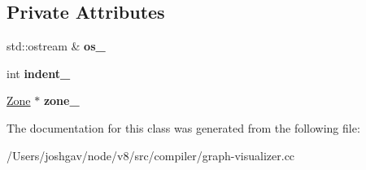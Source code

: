 \subsection*{Private Attributes}
\begin{DoxyCompactItemize}
\item 
std\+::ostream \& {\bfseries os\+\_\+}\hypertarget{classv8_1_1internal_1_1compiler_1_1_graph_c1_visualizer_a02c609603eafbffed257e4540e0d3e1b}{}\label{classv8_1_1internal_1_1compiler_1_1_graph_c1_visualizer_a02c609603eafbffed257e4540e0d3e1b}

\item 
int {\bfseries indent\+\_\+}\hypertarget{classv8_1_1internal_1_1compiler_1_1_graph_c1_visualizer_a42158ea691ed09f7863d9eb96a127e95}{}\label{classv8_1_1internal_1_1compiler_1_1_graph_c1_visualizer_a42158ea691ed09f7863d9eb96a127e95}

\item 
\hyperlink{classv8_1_1internal_1_1_zone}{Zone} $\ast$ {\bfseries zone\+\_\+}\hypertarget{classv8_1_1internal_1_1compiler_1_1_graph_c1_visualizer_ad0db37b02792327ba8c0c724fe8c5637}{}\label{classv8_1_1internal_1_1compiler_1_1_graph_c1_visualizer_ad0db37b02792327ba8c0c724fe8c5637}

\end{DoxyCompactItemize}


The documentation for this class was generated from the following file\+:\begin{DoxyCompactItemize}
\item 
/\+Users/joshgav/node/v8/src/compiler/graph-\/visualizer.\+cc\end{DoxyCompactItemize}
